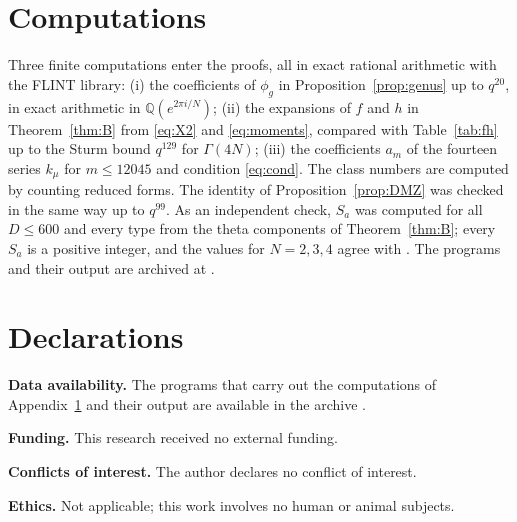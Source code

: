\documentclass[11pt]{amsart}
\theoremstyle{definition}
\newcommand{\QQ}{\mathbb{Q}}
\begin{document}
\section{Computations}\label{app:code}

Three finite computations enter the proofs, all in exact rational arithmetic with the FLINT library: (i) the coefficients of $\phi_g$ in Proposition~\ref{prop:genus} up to $q^{20}$, in exact arithmetic in $\QQ(e^{2\pi i/N})$; (ii) the expansions of $f$ and $h$ in Theorem~\ref{thm:B} from \eqref{eq:X2} and \eqref{eq:moments}, compared with Table~\ref{tab:fh} up to the Sturm bound $q^{129}$ for $\Gamma(4N)$; (iii) the coefficients $a_m$ of the fourteen series $k_\mu$ for $m\le12045$ and condition \eqref{eq:cond}. The class numbers are computed by counting reduced forms. The identity of Proposition~\ref{prop:DMZ} was checked in the same way up to $q^{99}$. As an independent check, $S_a$ was computed for all $D\le600$ and every type from the theta components of Theorem~\ref{thm:B}; every $S_a$ is a positive integer, and the values for $N=2,3,4$ agree with \cite{GSSV23}. The programs and their output are archived at \cite{Bha26}.

\FloatBarrier
\section*{Declarations}
\noindent\textbf{Data availability.} The programs that carry out the computations of Appendix~\ref{app:code} and their output are available in the archive \cite{Bha26}.

\noindent\textbf{Funding.} This research received no external funding.

\noindent\textbf{Conflicts of interest.} The author declares no conflict of interest.

\noindent\textbf{Ethics.} Not applicable; this work involves no human or animal subjects.
\end{document}
